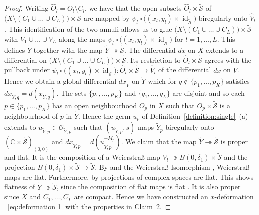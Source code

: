 \documentclass[11pt,twoside]{amsart}
\theoremstyle{plain}
\newcommand{\Sm}{\mathcal{S}}
\newcommand{\Sh}[1]{\mathcal{#1}} %
\DeclareMathOperator{\id}{id}
\newcommand{\dfx}{dx}
\begin{document}
\begin{proof}
Writing $\widehat O_l = O_l\setminus C_l $, we have that the open subsets $\widehat O_l\times\tilde{\Sm}$ of $\big(X\setminus(C_1\cup\ldots\cup C_L)\big)\times\tilde{\Sm}$ are mapped by $\psi_l\circ\big((x_l, y_l)\times\id_{\tilde{\Sm}}\big)$ biregularly onto $\widehat{V}_l$. This identification of the two annuli allows us to glue $\big(X\setminus(C_1\cup\ldots\cup C_L)\big)\times\tilde{\Sm}$ with $V_1\cup\ldots\cup V_L$ along the maps $\psi_l\circ\big((x_l, y_l)\times\id_{\tilde{\Sm}}\big)$ for $l=1,\ldots,L$. This defines $\tilde{Y}$ together with the map $\tilde{Y}\twoheadrightarrow\tilde{\Sm}$. The differential $\dfx $ on $X $ extends to a differential on $\big(X\setminus(C_1\cup\ldots\cup C_L)\big)\times\tilde{\Sm}$. Its restriction to $\widehat O_l\times\tilde{\Sm}$  agrees with the pullback under $\psi_l\circ\big((x_l,y_l)\times\id_{\tilde{\Sm}}\big):\widehat O_l\times\tilde{\Sm}\rightarrow \widehat{V}_l $ of the differential $ \dfx$ on $V$. 
Hence we obtain a global differential  $\dfx_{\tilde{Y}} $ on $ \tilde{Y} $ which for $q\notin\{p_1,\ldots , p_K\}$ satisfies $ \dfx_{\tilde{Y}, q} = d (x_{\tilde{Y}, q}) $. The sets $\{p_1,\ldots , p_K\}$ and $\{q_1,\ldots , q_L\} $ are disjoint and so each $p \in\{p_1, \ldots , p_K\} $ has an open neighbourhood $ O_p $ in $ X $ such that $ O_p\times\tilde{\Sm} $ is a neighbourhood of $p $ in $ \tilde{Y} $. Hence the germ  $u_p$ of Definition~\ref{definition:single}~(a)   extends to $u_{\tilde{Y},p}\in\Sh{O}_{\tilde{Y},p}$ such that $(u_{\tilde{Y},p},s)$ maps $\tilde{Y}_p$ biregularly onto $(\mathbb{C}\times\tilde{\Sm})_{(0,0)}$ and $\dfx_{\tilde{Y},p}=d(u_{\tilde{Y},p}^{-M_p})$.
  We claim that the map $\tilde{Y}\twoheadrightarrow\tilde{\Sm}$ is proper and flat. It is the composition of a Weierstra{\ss} map $V_l\twoheadrightarrow B(0,\delta_1)\times\tilde{\Sm}$ and the projection $B(0,\delta_1)\times\tilde{\Sm}\to\tilde{\Sm}$. By \cite[Chapter~II Proposition~2.10]{PR:94} and the Weierstra{\ss} Isomorphism \cite[Chapter~2 \S4.2]{GR:84}, Weierstra{\ss} maps are flat. Furthermore, by \cite[Chapter~II Corollary~2.7]{PR:94} projections of complex spaces are flat. This shows flatness of $\tilde{Y}\twoheadrightarrow\tilde{\Sm}$, since the composition of flat maps is flat \cite[Chapter~II Proposition~2.6]{PR:94}. It is also proper since $X$ and $C_1,\ldots,C_L$ are compact. Hence we have constructed an  $ x $-deformation ~\eqref{eq:deformation 1} with the properties in Claim~2.
  

\end{proof}
\end{document}
